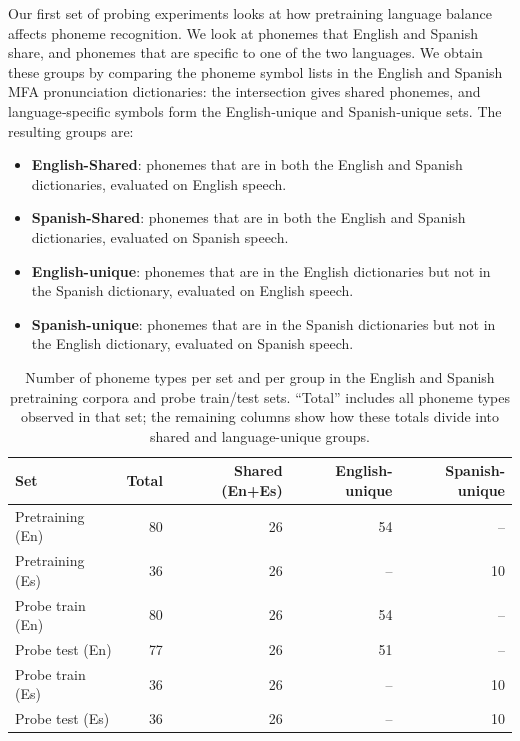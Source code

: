 Our first set of probing experiments looks at how pretraining language balance affects phoneme recognition. We look at phonemes that English and Spanish share, and phonemes that are specific to one of the two languages. We obtain these groups by comparing the phoneme symbol lists in the English and Spanish MFA pronunciation dictionaries: the intersection gives shared phonemes, and language‑specific symbols form the English‑unique and Spanish‑unique sets. The resulting groups are:

\begin{itemize}
    \item \textbf{English-Shared}: phonemes that are in both the English and Spanish dictionaries, evaluated on English speech.
    \item \textbf{Spanish-Shared}: phonemes that are in both the English and Spanish dictionaries, evaluated on Spanish speech.
    \item \textbf{English-unique}: phonemes that are in the English dictionaries but not in the Spanish dictionary, evaluated on English speech.
    \item \textbf{Spanish-unique}: phonemes that are in the Spanish dictionaries but not in the English dictionary, evaluated on Spanish speech.
\end{itemize}
\begin{table}[h]
    \centering
    \begin{tabular}{l r r r r}
        \hline
        Set & Total & Shared (En+Es) & English-unique & Spanish-unique \\
        \hline
        Pretraining (En) & 80
                         & 26 & 54 & -- \\
        Pretraining (Es) & 36
                         & 26 & --            & 10 \\
        Probe train (En) & 80
                         & 26 & 54 & -- \\
        Probe test (En)  & 77 
                         & 26 & 51 & -- \\
        Probe train (Es) & 36
                         & 26 & -- & 10 \\
        Probe test (Es)  & 36
                         & 26  & --               & 10 \\
        \hline
    \end{tabular}
    \caption{Number of phoneme types per set and per group in the English and Spanish pretraining corpora and probe train/test sets. “Total” includes all phoneme types observed in that set; the remaining columns show how these totals divide into shared and language-unique groups.}
    \label{ed_tab:phoneme_group_sizes_en_es}
\end{table}

